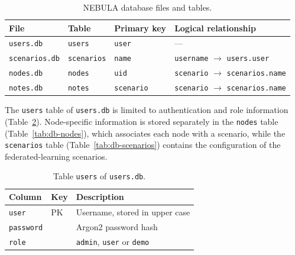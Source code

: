 \documentclass[9pt,a4paper,twocolumn]{article}
\begin{document}
\begin{table}[H]
\centering
\scriptsize
\begin{tabularx}{\columnwidth}{l l l X}
\hline
\textbf{File} & \textbf{Table} & \textbf{Primary key} & \textbf{Logical relationship} \\
\hline
\texttt{users.db}     & \texttt{users}     & \texttt{user}     & --- \\
\texttt{scenarios.db} & \texttt{scenarios} & \texttt{name}     & \texttt{username} $\rightarrow$ \texttt{users.user} \\
\texttt{nodes.db}     & \texttt{nodes}     & \texttt{uid}      & \texttt{scenario} $\rightarrow$ \texttt{scenarios.name} \\
\texttt{notes.db}     & \texttt{notes}     & \texttt{scenario} & \texttt{scenario} $\rightarrow$ \texttt{scenarios.name} \\
\hline
\end{tabularx}
\caption{NEBULA database files and tables.}
\label{tab:db-overview}
\end{table}

The \texttt{users} table of \texttt{users.db} is limited to authentication and role information (Table~\ref{tab:db-users}). Node-specific information is stored separately in the \texttt{nodes} table (Table~\ref{tab:db-nodes}), which associates each node with a scenario, while the \texttt{scenarios} table (Table~\ref{tab:db-scenarios}) contains the configuration of the federated-learning scenarios.

\begin{table}[H]
\centering
\footnotesize
\begin{tabularx}{\columnwidth}{l l X}
\hline
\textbf{Column} & \textbf{Key} & \textbf{Description} \\
\hline
\texttt{user}     & PK & Username, stored in upper case \\
\texttt{password} &    & Argon2 password hash \\
\texttt{role}     &    & \texttt{admin}, \texttt{user} or \texttt{demo} \\
\hline
\end{tabularx}
\caption{Table \texttt{users} of \texttt{users.db}.}
\label{tab:db-users}
\end{table}
\end{document}
